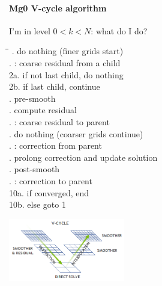 \begin{frame}[fragile,label=ss-recent-gravity] 
\secframetitle{\ssRecentGravity}
\framesubtitle{Mg0 V-cycle algorithm}
%
 I'm in level $0 < k < N$: what do I do?
 \begin{minipage}{2.5in}
\footnotesize
\vspace{0.1in}
\begin{tabbing}
\=\=\=\kill
{}. do nothing (finer grids start) \\
. : coarse residual from a child \\
\>\>	    2a. if not last child, do nothing \\
\>\>           2b. if last child, continue \\
. pre-smooth \\
. compute residual \\
. : coarse residual to parent \\
. do nothing (coarser grids continue) \\
. : correction from parent \\
. prolong correction and update solution \\
. post-smooth \\
. : correction to parent \\
\>\>           10a. if converged, end \\
\>\>	    10b. else goto 1
\end{tabbing}
\end{minipage}
\begin{minipage}{1.9in}
\centerline{\includegraphics[width=2.0in]{hpgmg_v_cycle.png}}
\end{minipage}
\end{frame}
%
